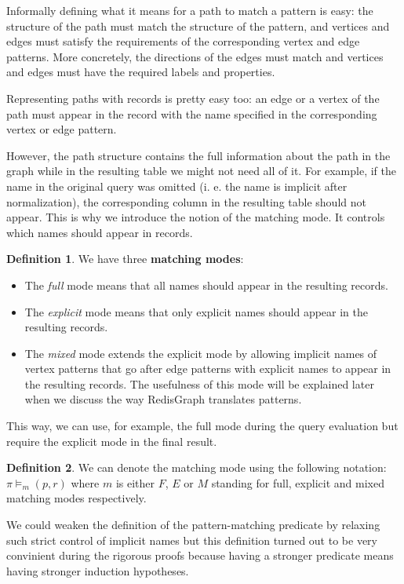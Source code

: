 \documentclass[14pt]{constructor-thesis}
\theoremstyle{definition}
\newtheorem*{definition}{Definition}
\begin{document}
Informally defining what it means for a path to match a pattern is easy: the structure of the path must match the structure of the pattern, and vertices and edges must satisfy the requirements of the corresponding vertex and edge patterns. More concretely, the directions of the edges must match and vertices and edges must have the required labels and properties.

Representing paths with records is pretty easy too: an edge or a vertex of the path must appear in the record with the name specified in the corresponding vertex or edge pattern.

However, the path structure contains the full information about the path in the graph while in the resulting table we might not need all of it. For example, if the name in the original query was omitted (i. e. the name is implicit after normalization), the corresponding column in the resulting table should not appear. This is why we introduce the notion of the matching mode. It controls which names should appear in records.

\begin{definition}
  We have three \textbf{matching modes}:
  \begin{itemize}
    \item The \textit{full} mode means that all names should appear in the resulting records.
    \item The \textit{explicit} mode means that only explicit names should appear in the resulting records.
    \item The \textit{mixed} mode extends the explicit mode by allowing implicit names of vertex patterns that go after edge patterns with explicit names to appear in the resulting records. The usefulness of this mode will be explained later when we discuss the way RedisGraph translates patterns.
  \end{itemize} 
\end{definition}

This way, we can use, for example, the full mode during the query evaluation but require the explicit mode in the final result.

\begin{definition}
  We can denote the matching mode using the following notation:
  $ \pi \models_m (p, r) $
  where $m$ is either $F$, $E$ or $M$ standing for full, explicit and mixed matching modes respectively.
\end{definition}

We could weaken the definition of the pattern-matching predicate by relaxing such strict control of implicit names but this definition turned out to be very convinient during the rigorous proofs because having a stronger predicate means having stronger induction hypotheses.
\end{document}
